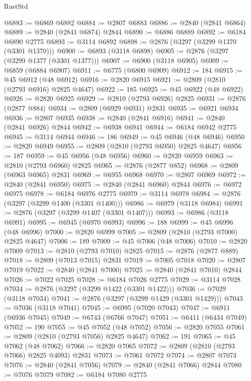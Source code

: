 \begin{lexlean}{RustStd}
\begin{coremodule}
@6883 := @6869 @6882
@6884 := @2807 @6883
@6886 := @2840 (@2841 @6864)
@6889 := @2840 (@2841 @6874) @2844
@6890 := @6886 @6889
@6892 := @6184 @6890 @2775
@6893 := @3114 @6892
@6898 := @2876 (@3297 (@3299 @1370 (@3301 @1370)))
@6900 := @6893 (@3118 @6898)
@6905 := @2876 (@3297 (@3299 @1377 (@3301 @1377)))
@6907 := @6900 (@3118 @6905)
@6909 := @6859 (@6884 @6907)
@6911 := @6775 (@6800 @6909)
@6912 := 184
@6915 := @45 @6912 (@48 @6912)
@6916 := @2820 @6915
@6921 := @2809 (@2810 (@2793 @6916) @2825 @4647)
@6922 := 185
@6925 := @45 @6922 (@48 @6922)
@6926 := @2820 @6925
@6929 := @2810 (@2793 @6926) @2825
@6931 := @2876 (@2877 @884)
@6934 := @2809 (@6929 @6931) @2831
@6935 := @6921 @6934
@6936 := @2807 @6935
@6938 := @2840 (@2841 @6916)
@6941 := @2840 (@2841 @6926) @2844
@6942 := @6938 @6941
@6944 := @6184 @6942 @2775
@6945 := @3114 @6944
@6946 := 186
@6949 := @45 @6946 (@48 @6946)
@6950 := @2820 @6949
@6955 := @2809 (@2810 (@2793 @6950) @2825 @4647)
@6956 := 187
@6959 := @45 @6956 (@48 @6956)
@6960 := @2820 @6959
@6963 := @2810 (@2793 @6960) @2825
@6965 := @2876 (@2877 @852)
@6968 := @2809 (@6963 @6965) @2831
@6969 := @6955 @6968
@6970 := @2807 @6969
@6972 := @2840 (@2841 @6950)
@6975 := @2840 (@2841 @6960) @2844
@6976 := @6972 @6975
@6978 := @6184 @6976 @2775
@6979 := @3114 @6978
@6984 := @2876 (@3297 (@3299 @1400 (@3301 @1400)))
@6986 := @6979 (@3118 @6984)
@6991 := @2876 (@3297 (@3299 @1407 (@3301 @1407)))
@6993 := @6986 (@3118 @6991)
@6995 := @6945 (@6970 @6993)
@6996 := 188
@6999 := @45 @6996 (@48 @6996)
@7000 := @2820 @6999
@7005 := @2809 (@2810 (@2793 @7000) @2825 @4647)
@7006 := 189
@7009 := @45 @7006 (@48 @7006)
@7010 := @2820 @7009
@7013 := @2810 (@2793 @7010) @2825
@7015 := @2876 (@2877 @889)
@7018 := @2809 (@7013 @7015) @2831
@7019 := @7005 @7018
@7020 := @2807 @7019
@7022 := @2840 (@2841 @7000)
@7025 := @2840 (@2841 @7010) @2844
@7026 := @7022 @7025
@7028 := @6184 @7026 @2775
@7029 := @3114 @7028
@7034 := @2876 (@3297 (@3299 @1422 (@3301 @1422)))
@7036 := @7029 (@3118 @7034)
@7041 := @2876 (@3297 (@3299 @1429 (@3301 @1429)))
@7043 := @7036 (@3118 @7041)
@7045 := @6995 (@7020 @7043)
@7047 := @6911 (@6936 @7045)
@7049 := @6743 (@6766 @7047)
@7051 := @6411 (@6434 @7049)
@7052 := 190
@7055 := @45 @7052 (@48 @7052)
@7056 := @2820 @7055
@7061 := @2809 (@2810 (@2793 @7056) @2825 @4647)
@7062 := 191
@7065 := @45 @7062 (@48 @7062)
@7066 := @2820 @7065
@7072 := @2809 (@2810 (@2793 @7066) @2825 @4093) @2831
@7073 := @7061 @7072
@7074 := @2807 @7073
@7076 := @2840 (@2841 @7056)
@7079 := @2840 (@2841 @7066) @2844
@7080 := @7076 @7079
@7082 := @6184 @7080 @2775

\end{coremodule}
\end{lexlean}
